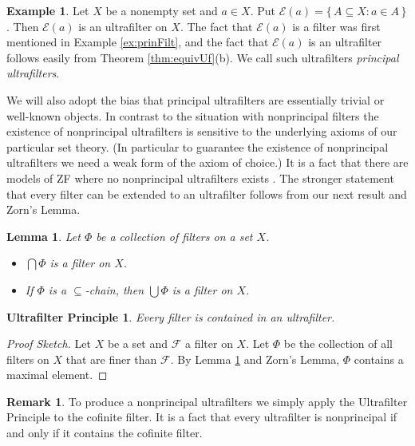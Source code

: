 \documentclass[12pt]{article}
\theoremstyle{plain}
\newtheorem{lem}[thm]{Lemma}
\newtheorem{up}[thm]{Ultrafilter Principle}
\theoremstyle{definition}
\newtheorem{rmk}[thm]{Remark}
\newtheorem{example}[thm]{Example}
\newcommand{\calE}{\mathcal{E}}
\newcommand{\calF}{\mathcal{F}}
\begin{document}
\begin{example}
  Let $X$ be a nonempty set and $a \in X$.
  Put $\calE(a) = \{\, A \subseteq X : a \in A \,\}$.
  Then $\calE(a)$ is an ultrafilter on $X$.
  The fact that $\calE(a)$ is a filter was first mentioned in Example  \ref{ex:prinFilt}, and the fact that $\calE(a)$ is an ultrafilter
  follows easily from Theorem \ref{thm:equivUf}(b).
  We call such ultrafilters \textsl{principal ultrafilters}.
\end{example}

We will also adopt the bias that principal ultrafilters are essentially trivial or well-known objects.
In contrast to the situation with nonprincipal filters the existence of nonprincipal ultrafilters is sensitive to the underlying axioms of our particular set theory.
(In particular to guarantee the existence of nonprincipal ultrafilters we need a weak form of the axiom of choice.)
It is a fact that there are models of ZF where no nonprincipal ultrafilters exists \cite{Blass:1977fk}.
The stronger statement that every filter can be extended to an ultrafilter follows from our next result and Zorn's Lemma.%

\begin{lem}
  \label{lem:chainFlt}
  Let $\Phi$ be a collection of filters on a set $X$.
  \begin{itemize}
    \item[(a)] $\bigcap\Phi$ is a filter on $X$.

    \item[(b)] If $\Phi$ is a \mbox{$\subseteq$-chain}, then $\bigcup\Phi$ is a filter on $X$.
  \end{itemize}
\end{lem}

\begin{up}
  Every filter is contained in an ultrafilter.
\end{up}
\begin{proof}[Proof Sketch]
  Let $X$ be a set and $\calF$ a filter on $X$.
  Let $\Phi$ be the collection of all filters on $X$ that are finer than $\calF$.
  By Lemma \ref{lem:chainFlt} and Zorn's Lemma, $\Phi$ contains a maximal element.
\end{proof}
\begin{rmk}
  To produce a nonprincipal ultrafilters we simply apply the Ultrafilter Principle to the cofinite filter.
  It is a fact that every ultrafilter is nonprincipal if and only if it contains the cofinite filter.
\end{rmk}
\end{document}
